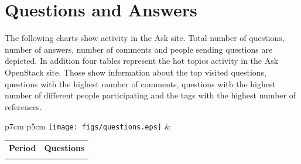\documentclass[a4wide,11pt]{report}
\begin{document}


\section{Questions and Answers}

The following charts show activity in the Ask site. Total number of questions, number of answers, number of comments and people sending questions are depicted. In addition four tables represent the hot topics activity in the Ask OpenStack site. Those show information about the top visited questions, questions with the highest number of comments, questions with the highest number of different people participating and the tags with the highest number of references. 

\begin{tabular}{p{7cm} p{5cm}}
    \vspace{0pt} 
    \texttt{[image: figs/questions.eps]}
    & 
    \vspace{0pt}
    \begin{tabular}{l|l}%
    \bfseries Period & \bfseries Questions %
    \csvreader[head to column names]{data/questions.csv}{}%
    {\\ & \questions}
    \end{tabular}
\end{tabular}
\end{document}
